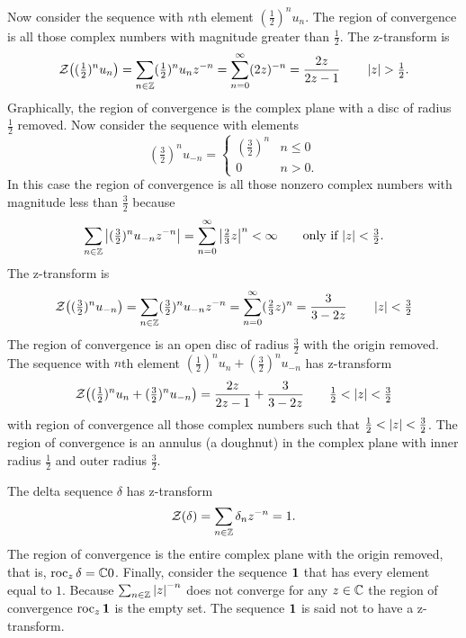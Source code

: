 Now consider the sequence with $n$th element $(\tfrac{1}{2})^{n} u_n$.  The region of convergence is all those complex numbers with magnitude greater than $\tfrac{1}{2}$.   The z-transform is
\[
{\mathcal Z}\big( (\tfrac{1}{2})^{n} u_n\big) = \sum_{n \in {\mathbb Z}} (\tfrac{1}{2})^{n} u_n z^{-n} = \sum_{n=0}^\infty (2z)^{-n} = \frac{2z}{2z - 1} \qquad \left\vert z \right\vert > \tfrac{1}{2} .
\]
Graphically, the region of convergence is the complex plane with a disc of radius $\tfrac{1}{2}$ removed.  Now consider the sequence with elements 
\[
(\tfrac{3}{2})^{n} u_{-n} =  \begin{cases} 
(\tfrac{3}{2})^{n} & n \leq 0 \\
0 & n > 0.
\end{cases}
\]
In this case the region of convergence is all those nonzero complex numbers with magnitude less than $\tfrac{3}{2}$ because
\[
\sum_{n\in{\mathbb Z}} \left\vert  (\tfrac{3}{2})^{n} u_{-n} z^{-n} \right\vert = \sum_{n=0}^\infty \left\vert \tfrac{2}{3}z \right\vert^{n} < \infty \qquad \text{only if $\left\vert z \right\vert < \tfrac{3}{2}$}.
\]
The z-transform is
\[
{\mathcal Z}\big( (\tfrac{3}{2})^n u_{-n} \big) = \sum_{n \in {\mathbb Z}} (\tfrac{3}{2})^{n} u_{-n} z^{-n} = \sum_{n=0}^\infty (\tfrac{2}{3} z)^{n} = \frac{3}{3 - 2z} \qquad \left\vert z \right\vert < \tfrac{3}{2}
\]
The region of convergence is an open disc of radius $\frac{3}{2}$ with the origin removed.  The sequence with $n$th element $(\tfrac{1}{2})^{n} u_n + (\frac{3}{2})^{n} u_{-n}$ has z-transform
\[
{\mathcal Z}\big((\tfrac{1}{2})^{n} u_n + (\tfrac{3}{2})^{n} u_{-n}\big) =  \frac{2z}{2z - 1} + \frac{3}{3 - 2z} \qquad \tfrac{1}{2} < \left\vert z \right\vert < \tfrac{3}{2}
\]
with region of convergence all those complex numbers such that $\tfrac{1}{2} < \left\vert z \right\vert < \tfrac{3}{2}$.  The region of convergence is an annulus (a doughnut) in the complex plane with inner radius $\tfrac{1}{2}$ and outer radius $\tfrac{3}{2}$.

The delta sequence $\delta$ has z-transform
\[
{\mathcal Z}(\delta) = \sum_{n \in {\mathbb Z}} \delta_n z^{-n} = 1.
\]
The region of convergence is the entire complex plane with the origin removed, that is, $\operatorname{roc}_z \delta = {\mathbb C} \\ 0$.  Finally, consider the sequence $\mathbf{1}$ that has every element equal to $1$.  Because $\sum_{n \in {\mathbb Z}} \left\vert z \right\vert^{-n}$ does not converge for any $z \in {\mathbb C}$ the region of convergence $\operatorname{roc}_z \mathbf{1}$ is the empty set.  The sequence $\mathbf{1}$ is said not to have a z-transform.

